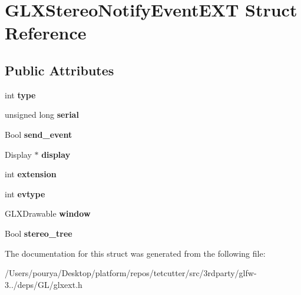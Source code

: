 \hypertarget{structGLXStereoNotifyEventEXT}{}\section{G\+L\+X\+Stereo\+Notify\+Event\+E\+X\+T Struct Reference}
\label{structGLXStereoNotifyEventEXT}
\subsection*{Public Attributes}
\begin{DoxyCompactItemize}
\item 
\hypertarget{structGLXStereoNotifyEventEXT_a098037ce0974bffdeb483d2a11d61643}{}int {\bfseries type}\label{structGLXStereoNotifyEventEXT_a098037ce0974bffdeb483d2a11d61643}

\item 
\hypertarget{structGLXStereoNotifyEventEXT_ae1e4129c552f83aedc025285289aa1c9}{}unsigned long {\bfseries serial}\label{structGLXStereoNotifyEventEXT_ae1e4129c552f83aedc025285289aa1c9}

\item 
\hypertarget{structGLXStereoNotifyEventEXT_a8cfd4a4d82499cf3784eb3880b65af3a}{}Bool {\bfseries send\+\_\+event}\label{structGLXStereoNotifyEventEXT_a8cfd4a4d82499cf3784eb3880b65af3a}

\item 
\hypertarget{structGLXStereoNotifyEventEXT_a66b9c9af34977ca155c83f3cf31eec10}{}Display $\ast$ {\bfseries display}\label{structGLXStereoNotifyEventEXT_a66b9c9af34977ca155c83f3cf31eec10}

\item 
\hypertarget{structGLXStereoNotifyEventEXT_a3a648bb8af498f7c8dfcd1c5790f798e}{}int {\bfseries extension}\label{structGLXStereoNotifyEventEXT_a3a648bb8af498f7c8dfcd1c5790f798e}

\item 
\hypertarget{structGLXStereoNotifyEventEXT_ab1ba0612de321691a9e617673b0adb38}{}int {\bfseries evtype}\label{structGLXStereoNotifyEventEXT_ab1ba0612de321691a9e617673b0adb38}

\item 
\hypertarget{structGLXStereoNotifyEventEXT_ac59f259d82ae632609172f48d7b10d01}{}G\+L\+X\+Drawable {\bfseries window}\label{structGLXStereoNotifyEventEXT_ac59f259d82ae632609172f48d7b10d01}

\item 
\hypertarget{structGLXStereoNotifyEventEXT_ac9ba848b101465fd03dee4879aaa5c93}{}Bool {\bfseries stereo\+\_\+tree}\label{structGLXStereoNotifyEventEXT_ac9ba848b101465fd03dee4879aaa5c93}

\end{DoxyCompactItemize}


The documentation for this struct was generated from the following file\+:\begin{DoxyCompactItemize}
\item 
/\+Users/pourya/\+Desktop/platform/repos/tetcutter/src/3rdparty/glfw-\/3../deps/\+G\+L/glxext.\+h\end{DoxyCompactItemize}
